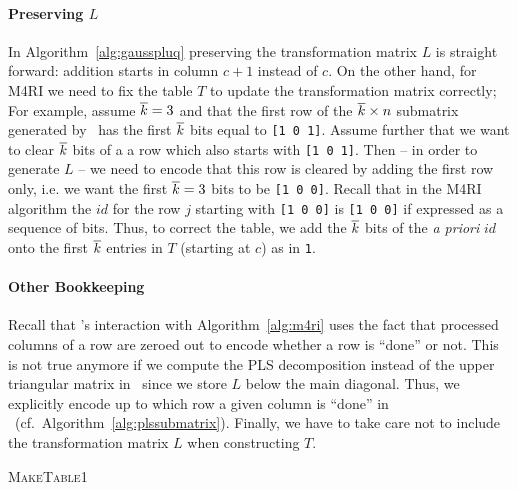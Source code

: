 \paragraph*{Preserving $L$}
In Algorithm~\ref{alg:gausspluq} preserving the transformation matrix $L$ is straight forward: addition starts in column $c + 1$ instead of $c$. On the other hand, for M4RI we need to fix the table $T$ to update the transformation matrix correctly; For example, assume $\overline{k} = 3 $ and that the first row of the $\overline{k} \times n$ submatrix generated by \gausssubmatrix\ has the first $\overline{k}$ bits equal to \texttt{[1 0 1]}. Assume further that we want to clear $\overline{k}$ bits of a a row which also starts with \texttt{[1 0 1]}. Then -- in order to generate $L$ -- we need to encode that this row is cleared by adding the first row only, i.e. we want the first $\overline{k} = 3$ bits to be \texttt{[1 0 0]}. Recall that in the M4RI algorithm the $id$ for the row $j$ starting with \texttt{[1 0 0]} is \texttt{[1 0 0]} if expressed as a sequence of bits. Thus, to correct the table, we add the $\overline{k}$ bits of the \emph{a priori} $id$ onto the first $\overline{k}$ entries in $T$ (starting at $c$) as in \maketable\texttt{1}.

\paragraph*{Other Bookkeeping}
Recall that \gausssubmatrix's interaction with Algorithm~\ref{alg:m4ri} uses the fact that processed columns of a row are zeroed out to encode whether a row is ``done'' or not. This is not true anymore if we compute the PLS decomposition instead of the upper triangular matrix in \gausssubmatrix\ since we store $L$ below the main diagonal. Thus, we explicitly encode up to which row a given column is ``done'' in \plssubmatrix\ (cf.\ Algorithm~\ref{alg:plssubmatrix}). Finally, we have to take care not to include the transformation matrix $L$ when constructing $T$.

\begin{algorithm}[htbp]
\caption{\textsc{MakeTable1}}
\label{alg:maketable1}
\end{algorithm}

